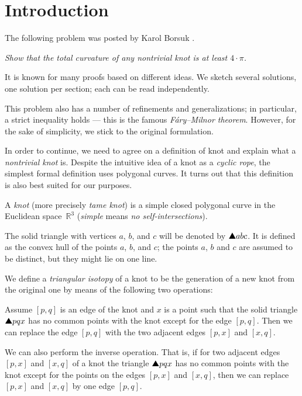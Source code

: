 \section*{Introduction}

The following problem was posted by Karol Borsuk \cite{borsuk}.

\smallskip

\textit{Show that the total curvature of any nontrivial knot is at least $4\cdot\pi$.}

\smallskip

It is known for many proofs based on different ideas.
We sketch several solutions, one solution per section;
each can be read independently.

This problem also has a number of refinements and generalizations;
in particular, a strict inequality holds --- this is the famous \emph{Fáry--Milnor theorem}.
However, for the sake of simplicity, we stick to the original formulation.

In order to continue, we need to agree on a definition of knot and explain what a \emph{nontrivial knot} is.
Despite the intuitive idea of a knot as a \emph{cyclic rope},
the simplest formal definition uses polygonal curves.
It turns out that this definition is also best suited for our purposes.

A \emph{knot} (more precisely \emph{tame knot}) is a simple closed polygonal curve in the Euclidean space~$\mathbb{R}^3$ (\emph{simple} means \emph{no self-intersections}).

The solid triangle with vertices $a$, $b$, and $c$ will be denoted by $\solidtriangle abc$.
It is defined as the convex hull of the points $a$, $b$, and $c$;
the points $a$, $b$ and $c$ are assumed to be distinct, but they might lie on one line.

We define a \emph{triangular isotopy} of a knot to be the generation of a new knot from the original one by means of the
following two operations:

Assume $[p,q]$ is an edge of the knot and $x$
is a point such that the solid triangle $\solidtriangle pqx$  has no common points with the knot except for the edge $[p,q]$.
Then we can replace the edge $[p,q]$ with the two adjacent edges $[p,x]$ and $[x,q]$.

We can also perform the inverse operation.
That is, if for two adjacent edges $[p,x]$ and $[x,q]$ of a knot the triangle
$\solidtriangle pqx$ has no common points with the knot except for the points on the edges $[p,x]$ and $[x,q]$,
then we can replace $[p,x]$ and $[x,q]$ by one edge $[p,q]$.


